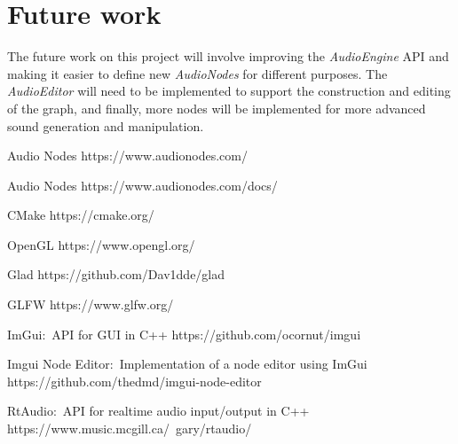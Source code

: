 \documentclass[conference]{IEEEtran}
\begin{document}
\section{Future work}
The future work on this project will involve improving the \textit{AudioEngine} API and making it easier to define new \textit{AudioNodes} for different purposes. The \textit{AudioEditor} will need to be implemented to support the construction and editing of the graph, and finally, more nodes will be implemented for more advanced sound generation and manipulation.

\begin{thebibliography}{1}
Audio Nodes https://www.audionodes.com/

Audio Nodes https://www.audionodes.com/docs/

CMake https://cmake.org/

OpenGL https://www.opengl.org/

Glad https://github.com/Dav1dde/glad

GLFW https://www.glfw.org/

ImGui:~API for GUI in C++ https://github.com/ocornut/imgui

Imgui Node Editor:~Implementation of a node editor using ImGui https://github.com/thedmd/imgui-node-editor

RtAudio:~API for realtime audio input/output in C++ https://www.music.mcgill.ca/~gary/rtaudio/

\end{thebibliography}
\end{document}
